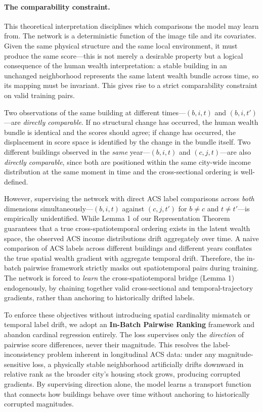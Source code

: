 \documentclass{article}
\begin{document}
\paragraph{The comparability constraint.}
This theoretical interpretation disciplines which comparisons the model may learn from. The network is a deterministic function of the image tile and its covariates. Given the same physical structure and the same local environment, it must produce the same score---this is not merely a desirable property but a logical consequence of the human wealth interpretation: a stable building in an unchanged neighborhood represents the same latent wealth bundle across time, so its mapping must be invariant. This gives rise to a strict comparability constraint on valid training pairs.

Two observations of the same building at different times---$(b, i, t)$ and $(b, i, t')$---are \textit{directly comparable}. If no structural change has occurred, the human wealth bundle is identical and the scores should agree; if change has occurred, the displacement in score space is identified by the change in the bundle itself. Two different buildings observed in the \textit{same} year---$(b, i, t)$ and $(c, j, t)$---are also \textit{directly comparable}, since both are positioned within the same city-wide income distribution at the same moment in time and the cross-sectional ordering is well-defined.

However, supervising the network with direct ACS label comparisons across \textit{both} dimensions simultaneously---$(b, i, t)$ against $(c, j, t')$ for $b \neq c$ and $t \neq t'$---is empirically unidentified. While Lemma 1 of our Representation Theorem guarantees that a true cross-spatiotemporal ordering exists in the latent wealth space, the observed ACS income distributions drift aggregately over time. A naive comparison of ACS labels across different buildings and different years conflates the true spatial wealth gradient with aggregate temporal drift. Therefore, the in-batch pairwise framework strictly masks out spatiotemporal pairs during training. The network is forced to \textit{learn} the cross-spatiotemporal bridge (Lemma 1) endogenously, by chaining together valid cross-sectional and temporal-trajectory gradients, rather than anchoring to historically drifted labels.

To enforce these objectives without introducing spatial cardinality mismatch or temporal label drift, we adopt an \textbf{In-Batch Pairwise Ranking} framework and abandon cardinal regression entirely. The loss supervises only the \textit{direction} of pairwise score differences, never their magnitude. This resolves the label-inconsistency problem inherent in longitudinal ACS data: under any magnitude-sensitive loss, a physically stable neighborhood artificially drifts downward in relative rank as the broader city's housing stock grows, producing corrupted gradients. By supervising direction alone, the model learns a transport function that connects how buildings behave over time without anchoring to historically corrupted magnitudes.
\end{document}
